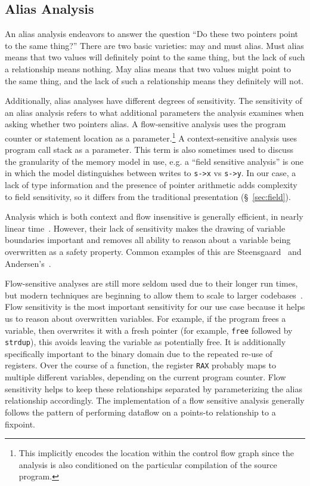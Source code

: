 \subsection{Alias Analysis}
An alias analysis endeavors to answer the question ``Do these two pointers point to the same thing?''
There are two basic varieties: may and must alias.
Must alias means that two values will definitely point to the same thing, but the lack of such a relationship means nothing.
May alias means that two values might point to the same thing, and the lack of such a relationship means they definitely will not.

Additionally, alias analyses have different degrees of sensitivity.
The sensitivity of an alias analysis refers to what additional parameters the analysis examines when asking whether two pointers alias.
A flow-sensitive analysis uses the program counter or statement location as a parameter.\footnote{
This implicitly encodes the location within the control flow graph since the analysis is also conditioned on the particular compilation of the source program.}
A context-sensitive analysis uses program call stack as a parameter.
This term is also sometimes used to discuss the granularity of the memory model in use, e.g. a ``field sensitive analysis'' is one in which the model distinguishes between writes to \texttt{s->x} vs \texttt{s->y}.
In our case, a lack of type information and the presence of pointer arithmetic adds complexity to field sensitivity, so it differs from the traditional presentation (\S~\ref{sec:field}).

Analysis which is both context and flow insensitive is generally efficient, in nearly linear time~\cite{steensgaard-alias}.
However, their lack of sensitivity makes the drawing of variable boundaries important and removes all ability to reason about a variable being overwritten as a safety property.
Common examples of this are Steensgaard~\cite{steensgaard-alias} and Andersen's~\cite{andersen-alias}.

Flow-sensitive analyses are still more seldom used due to their longer run times, but modern techniques are beginning to allow them to scale to larger codebases~\cite{sfs}.
Flow sensitivity is the most important sensitivity for our use case because it helps us to reason about overwritten variables.
For example, if the program frees a variable, then overwrites it with a fresh pointer (for example, \texttt{free} followed by \texttt{strdup}), this avoids leaving the variable as potentially free.
It is additionally specifically important to the binary domain due to the repeated re-use of registers.
Over the course of a function, the register \texttt{RAX} probably maps to multiple different variables, depending on the current program counter.
Flow sensitivity helps to keep these relationships separated by parameterizing the alias relationship accordingly.
The implementation of a flow sensitive analysis generally follows the pattern of performing dataflow on a points-to relationship to a fixpoint.

